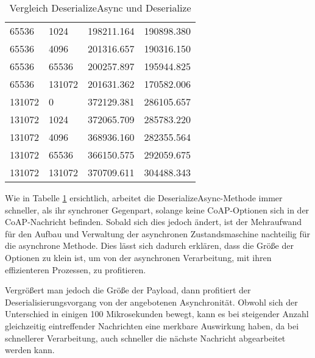 \begin{table}[h]
\begin{tabular}{@{}llll@{}}
    65536               & 1024              & 198211.164                     & 190898.380                \\
    65536               & 4096              & 201316.657                     & 190316.150                \\
    65536               & 65536             & 200257.897                     & 195944.825                \\
    65536               & 131072            & 201631.362                     & 170582.006                \\
    131072              & 0                 & 372129.381                     & 286105.657                \\
    131072              & 1024              & 372065.709                     & 285783.220                \\
    131072              & 4096              & 368936.160                     & 282355.564                \\
    131072              & 65536             & 366150.575                     & 292059.675                \\
    131072              & 131072            & 370709.611                     & 304488.343                \\ \bottomrule
    \end{tabular}%
    \caption{Vergleich DeserializeAsync und Deserialize}
    \label{tab:vergleich-deserialize-async-deserialize}
\end{table}

Wie in Tabelle \ref{tab:vergleich-deserialize-async-deserialize} ersichtlich, arbeitet die DeserializeAsync-Methode immer schneller, als ihr synchroner Gegenpart, solange keine CoAP-Optionen sich in der CoAP-Nachricht befinden. Sobald sich dies jedoch ändert, ist der Mehraufwand für den Aufbau und Verwaltung der asynchronen Zustandsmaschine nachteilig für die asynchrone Methode. Dies lässt sich dadurch erklären, dass die Größe der Optionen zu klein ist, um von der asynchronen Verarbeitung, mit ihren effizienteren Prozessen, zu profitieren.

Vergrößert man jedoch die Größe der Payload, dann profitiert der Deserialisierungsvorgang von der angebotenen Asynchronität. Obwohl sich der Unterschied in einigen 100 Mikrosekunden bewegt, kann es bei steigender Anzahl gleichzeitig eintreffender Nachrichten eine merkbare Auswirkung haben, da bei schnellerer Verarbeitung, auch schneller die nächste Nachricht abgearbeitet werden kann.

